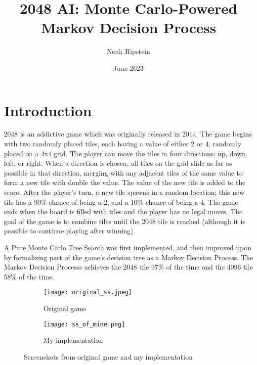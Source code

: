 \documentclass{article}
\title{2048 AI: Monte Carlo-Powered Markov Decision Process}
\author{Noah Ripstein}
\date{June 2023}
\begin{document}
\maketitle

\section{Introduction}

2048 is an addictive game which was originally released in 2014.  The game begins with two randomly placed tiles, each having a value of either 2 or 4, randomly placed on a 4x4 grid. The player can move the tiles in four directions: up, down, left, or right. When a direction is chosen, all tiles on the grid slide as far as possible in that direction, merging with any adjacent tiles of the same value to form a new tile with double the value.  The value of the new tile is added to the score. After the player's turn,  a new tile spawns in a random location; this new tile has a 90\% chance of being a 2, and a 10\% chance of being a 4.   The game ends when the board is filled with tiles and the player has no legal moves.  The goal of the game is to combine tiles until the 2048 tile is reached (although it is possible to continue playing after winning).

A Pure Monte Carlo Tree Search was first implemented, and then improved upon by formalizing part of the game's decision tree as a Markov Decision Process.  The Markov Decision Processs achieves the 2048 tile 97\% of the time and the 4096 tile 58\% of the time. 



\begin{figure}[htbp]
  \centering
  \begin{subfigure}[b]{0.45\textwidth}
    \texttt{[image: original\_ss.jpeg]}
    \caption{Original game}
    \label{fig:original_ss}
  \end{subfigure}
  \hfill
  \begin{subfigure}[b]{0.45\textwidth}
    \texttt{[image: ss\_of\_mine.png]}
    \caption{My implementation}
    \label{fig:ss_of_mine}
  \end{subfigure}
  \caption{Screenshots from original game and my implementation}
  \label{fig:screenshots}
\end{figure}
\end{document}
